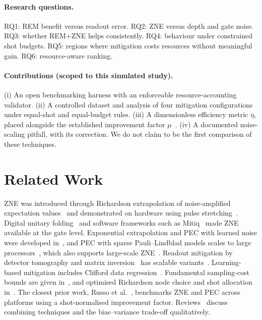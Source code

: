 \documentclass[11pt]{article}
\begin{document}
\paragraph{Research questions.} RQ1: REM benefit versus readout error. RQ2: ZNE versus depth and gate noise. RQ3: whether
REM+ZNE helps consistently. RQ4: behaviour under constrained shot budgets. RQ5: regions where mitigation costs resources without meaningful
gain. RQ6: resource-aware ranking.

\paragraph{Contributions (scoped to this simulated study).} (i) An open benchmarking harness with an enforceable
resource-accounting validator. (ii) A controlled dataset and analysis of four mitigation configurations under equal-shot and
equal-budget rules. (iii) A dimensionless efficiency metric $\eta$, placed alongside the established improvement factor $\mu$~\cite{russo2023}.
(iv) A documented noise-scaling pitfall, with its correction. We do not claim to be the first comparison of these techniques.

\section{Related Work}
ZNE was introduced through Richardson extrapolation of noise-amplified expectation values~\cite{temme2017,li2017} and
demonstrated on hardware using pulse stretching~\cite{kandala2019}. Digital unitary folding~\cite{giurgica2020} and software frameworks such as
Mitiq~\cite{larose2022} made ZNE available at the gate level. Exponential extrapolation and PEC with learned noise were
developed in~\cite{endo2018}, and PEC with sparse Pauli--Lindblad models scales to large processors~\cite{vandenberg2023},
which also supports large-scale ZNE~\cite{kim2023}. Readout mitigation by detector tomography and matrix inversion~\cite{maciejewski2020} has
scalable variants~\cite{bravyi2021,nation2021}. Learning-based mitigation includes Clifford data regression~\cite{czarnik2021}.
Fundamental sampling-cost bounds are given in~\cite{takagi2022,quek2024}, and optimised Richardson node choice and shot allocation in~\cite{krebsbach2022}.
The closest prior work, Russo et al.~\cite{russo2023}, benchmarks ZNE and PEC across platforms using a shot-normalised
improvement factor. Reviews~\cite{endo2021,cai2023review} discuss combining techniques and the bias--variance trade-off qualitatively.
\end{document}
